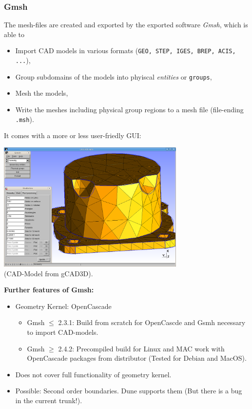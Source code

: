 \begin{frame}
  \frametitle{Gmsh}
  The mesh-files are created and exported by the exported software \emph{Gmsh},
  which is able to
  \begin{itemize}
    \item Import CAD models in various formats
      (\lstinline!GEO, STEP, IGES, BREP, ACIS, ...!),
    \item Group subdomains of the models into phyiscal \emph{entities} or
      \lstinline{groups},
    \item Mesh the models,
    \item Write the meshes including physical group regions to a mesh file
      (file-ending \lstinline!.msh!).
  \end{itemize}
  It comes with a more or less user-friedly GUI:
  \begin{center}
    \includegraphics[width=0.7\textwidth]{./EPS/gcad3d_deckel}
    \\
    {\tiny (CAD-Model from gCAD3D).}
  \end{center}
  \textbf{Further features of Gmsh:}
  \begin{itemize}
    \item Geometry Kernel: OpenCascade
      \begin{itemize}
        \item Gmsh $\leq$ 2.3.1: Build from scratch for OpenCascde and Gsmh
          necessary to import CAD-models.
        \item Gmsh $\geq$ 2.4.2: Precompiled build for Linux and MAC work with
          OpenCascade packages from distributor (Tested for Debian and MacOS).
      \end{itemize}
    \item Does not cover full functionality of geometry kernel.
    \item Possible: Second order boundaries. Dune supports them (But there is a
      bug in the current trunk!).
  \end{itemize}
\end{frame}

